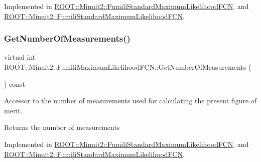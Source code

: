 Implemented in \mbox{\hyperlink{classROOT_1_1Minuit2_1_1FumiliStandardMaximumLikelihoodFCN_a6eb1fbf9c0c13057e080f8ed7af7a1c2}{R\+O\+O\+T\+::\+Minuit2\+::\+Fumili\+Standard\+Maximum\+Likelihood\+F\+CN}}, and \mbox{\hyperlink{classROOT_1_1Minuit2_1_1FumiliStandardMaximumLikelihoodFCN_a942bb66ec7d48d9ec0ea3d883dff7378}{R\+O\+O\+T\+::\+Minuit2\+::\+Fumili\+Standard\+Maximum\+Likelihood\+F\+CN}}.

\mbox{\label{classROOT_1_1Minuit2_1_1FumiliMaximumLikelihoodFCN_af0a6b5a302f978363074039c7d55d529}} 
\subsubsection{\texorpdfstring{GetNumberOfMeasurements()}{GetNumberOfMeasurements()}\hspace{0.1cm}{\footnotesize\ttfamily [1/2]}}
{\footnotesize\ttfamily virtual int R\+O\+O\+T\+::\+Minuit2\+::\+Fumili\+Maximum\+Likelihood\+F\+C\+N\+::\+Get\+Number\+Of\+Measurements (\begin{DoxyParamCaption}{ }\end{DoxyParamCaption}) const\hspace{0.3cm}{\ttfamily [pure virtual]}}

Accessor to the number of measurements used for calculating the present figure of merit.

\begin{DoxyReturn}{Returns}
the number of measurements 
\end{DoxyReturn}


Implemented in \mbox{\hyperlink{classROOT_1_1Minuit2_1_1FumiliStandardMaximumLikelihoodFCN_a09175207d6c0ed94898f3985b4d376d2}{R\+O\+O\+T\+::\+Minuit2\+::\+Fumili\+Standard\+Maximum\+Likelihood\+F\+CN}}, and \mbox{\hyperlink{classROOT_1_1Minuit2_1_1FumiliStandardMaximumLikelihoodFCN_a7c1f879db750fb33c206d3edbbd19ae0}{R\+O\+O\+T\+::\+Minuit2\+::\+Fumili\+Standard\+Maximum\+Likelihood\+F\+CN}}.

\mbox{\label{classROOT_1_1Minuit2_1_1FumiliMaximumLikelihoodFCN_af0a6b5a302f978363074039c7d55d529}} 
